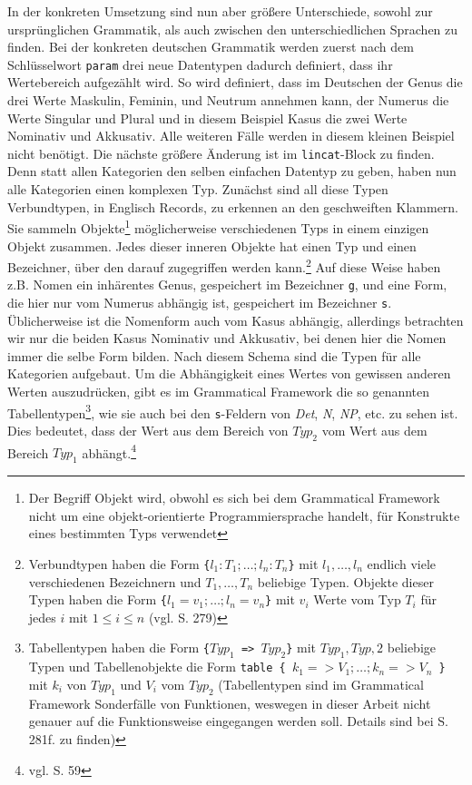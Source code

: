 In der konkreten Umsetzung sind nun aber größere Unterschiede, sowohl zur ursprünglichen Grammatik, als auch zwischen den unterschiedlichen Sprachen zu finden. Bei der konkreten deutschen Grammatik werden zuerst nach dem Schlüsselwort \texttt{param} drei neue Datentypen dadurch definiert, dass ihr Wertebereich aufgezählt wird. So wird definiert, dass im Deutschen der Genus die drei Werte Maskulin, Feminin, und Neutrum annehmen kann, der Numerus die Werte Singular und Plural und in diesem Beispiel Kasus die zwei Werte Nominativ und Akkusativ. Alle weiteren Fälle werden in diesem kleinen Beispiel nicht benötigt. Die nächste größere Änderung ist im \texttt{lincat}-Block zu finden. Denn statt allen Kategorien den selben einfachen Datentyp zu geben, haben nun alle Kategorien einen komplexen Typ. Zunächst sind all diese Typen Verbundtypen, in Englisch Records, zu erkennen an den geschweiften Klammern. Sie sammeln Objekte\footnote{Der Begriff Objekt wird, obwohl es sich bei dem Grammatical Framework nicht um eine objekt-orientierte Programmiersprache handelt, für Konstrukte eines bestimmten Typs verwendet} möglicherweise verschiedenen Typs in einem einzigen Objekt zusammen. Jedes dieser inneren Objekte hat einen Typ und einen Bezeichner, über den darauf zugegriffen werden kann.\footnote{Verbundtypen haben die Form \texttt{\{$l_1 : T_1 ; \dots ; l_n : T_n$\}} mit $l_1, \dots, l_n$ endlich viele verschiedenen Bezeichnern und $T_1, \dots, T_n$ beliebige Typen. Objekte dieser Typen haben die Form \texttt{\{$l_1 = v_1 ; \dots ; l_n = v_n$\}} mit $v_i$ Werte vom Typ $T_i$ für jedes $i$ mit $1\leq i\leq n$ (vgl. \cite{RANTA2011} S. 279)} Auf diese Weise haben z.B. Nomen ein inhärentes Genus, gespeichert im Bezeichner \texttt{g}, und eine Form, die hier nur vom Numerus abhängig ist, gespeichert im Bezeichner \texttt{s}. Üblicherweise ist die Nomenform auch vom Kasus abhängig, allerdings betrachten wir nur die beiden Kasus Nominativ und Akkusativ, bei denen hier die Nomen immer die selbe Form bilden. Nach diesem Schema sind die Typen für alle Kategorien aufgebaut. Um die Abhängigkeit eines Wertes von gewissen anderen Werten auszudrücken, gibt es im Grammatical Framework die so genannten Tabellentypen\footnote{Tabellentypen haben die Form \texttt{\{$Typ_1$ => $Typ_2$\}} mit $Typ_1,Typ,2$ beliebige Typen und Tabellenobjekte die Form \texttt{table \{ $k_1 => V_1 ; \dots ; k_n => V_n$ \}} mit $k_i$ von $Typ_1$ und $V_i$ vom $Typ_2$ (Tabellentypen sind im Grammatical Framework Sonderfälle von Funktionen, weswegen in dieser Arbeit nicht genauer auf die Funktionsweise eingegangen werden soll. Details sind bei \cite{RANTA2011} S. 281f. zu finden)}, wie sie auch bei den \texttt{s}-Feldern von \textit{Det}, \textit{N}, \textit{NP}, etc. zu sehen ist. Dies bedeutet, dass der Wert aus dem Bereich von $Typ_2$ vom Wert aus dem Bereich $Typ_1$ abhängt.\footnote{vgl. \cite{RANTA2011} S. 59} \par

